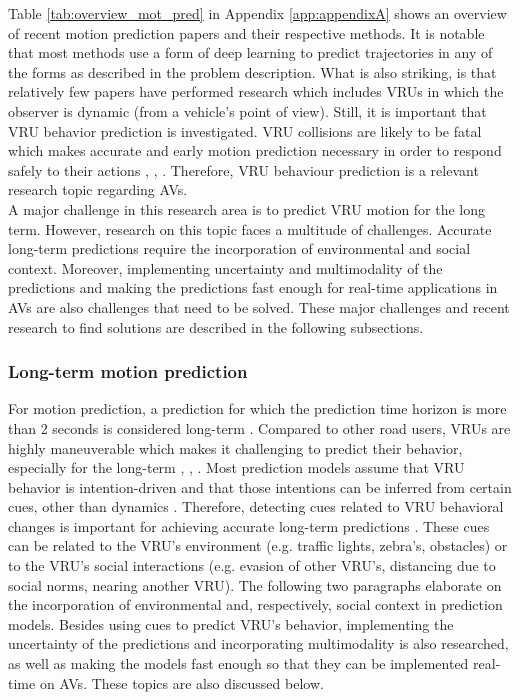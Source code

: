 Table \ref{tab:overview_mot_pred} in Appendix \ref{app:appendixA} shows an overview of recent motion prediction papers and their respective methods. It is notable that most methods use a form of deep learning to predict trajectories in any of the forms as described in the problem description. What is also striking, is that relatively few papers have performed research which includes \glspl{VRU} in which the observer is dynamic (from a vehicle's point of view). Still, it is important that \gls{VRU} behavior prediction is investigated. \gls{VRU} collisions are likely to be fatal which makes accurate and early motion prediction necessary in order to respond safely to their actions \cite{rehder2018pedestrian}, \cite{chou2020predicting}, \cite{uah2020d4}. Therefore, \gls{VRU} behaviour prediction is a relevant research topic regarding \glspl{AV}.\\
A major challenge in this research area is to predict \gls{VRU} motion for the long term. However, research on this topic faces a multitude of challenges. Accurate long-term predictions require the incorporation of environmental and social context. Moreover, implementing uncertainty and multimodality of the predictions and making the predictions fast enough for real-time applications in \glspl{AV} are also challenges that need to be solved. These major challenges and recent research to find solutions are described in the following subsections. 

\subsubsection{Long-term motion prediction}
For motion prediction, a prediction for which the prediction time horizon is more than 2 seconds is considered long-term \cite{hormann2020long}. Compared to other road users, \glspl{VRU} are highly maneuverable which makes it challenging to predict their behavior, especially for the long-term \cite{xiong2019recurrent}, \cite{rehder2018pedestrian}, \cite{rehder2018pedestrian}. Most prediction models assume that \gls{VRU} behavior is intention-driven and that those intentions can be inferred from certain cues, other than dynamics \cite{rehder2018pedestrian}. Therefore, detecting cues related to \gls{VRU} behavioral changes is important for achieving accurate long-term predictions \cite{pool2017using}. These cues can be related to the \gls{VRU}'s environment (e.g. traffic lights, zebra's, obstacles) or to the \gls{VRU}'s social interactions (e.g. evasion of other \gls{VRU}'s, distancing due to social norms, nearing another \gls{VRU}). The following two paragraphs elaborate on the incorporation of environmental and, respectively, social context in prediction models. Besides using cues to predict \gls{VRU}'s behavior, implementing the uncertainty of the predictions and incorporating multimodality is also researched, as well as making the models fast enough so that they can be implemented real-time on \glspl{AV}. These topics are also discussed below. 

